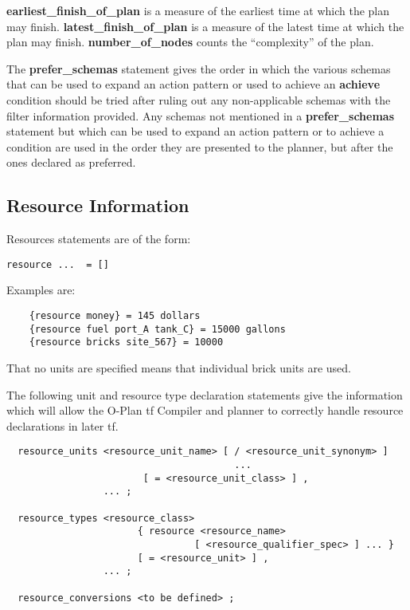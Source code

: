 {\bf earliest\_finish\_of\_plan} is a measure of the earliest time at which
the plan may finish.  {\bf latest\_finish\_of\_plan} is a measure of the
latest time at which the plan may finish.  {\bf number\_of\_nodes} counts the
``complexity'' of the plan.

The {\bf prefer\_schemas} statement gives the order in which the various
schemas that can be used to expand an action pattern or used to achieve
an {\bf achieve} condition should be tried after ruling out any
non-applicable schemas with the filter information provided.  Any
schemas not mentioned in a {\bf prefer\_schemas} statement but which can
be used to expand an action pattern or to achieve a condition are used
in the order they are presented to the planner, but after the ones
declared as preferred. 

\subsection{Resource Information}

Resources statements are of the form:

\begin{tabbing}
   {\tt {resource   ... }
       =  []}
\end{tabbing}

Examples are:
\begin{verbatim}
    {resource money} = 145 dollars
    {resource fuel port_A tank_C} = 15000 gallons
    {resource bricks site_567} = 10000
\end{verbatim}

That no units are specified means that individual brick units are used.

The following unit and resource type declaration statements give the
information which will allow the O-Plan {\sc tf} Compiler and planner to
correctly handle resource declarations in later {\sc tf}.

\begin{verbatim}
  resource_units <resource_unit_name> [ / <resource_unit_synonym> ]
                                        ...
                        [ = <resource_unit_class> ] ,
                 ... ;

  resource_types <resource_class>
                       { resource <resource_name>
                                 [ <resource_qualifier_spec> ] ... }
                       [ = <resource_unit> ] ,
                 ... ;

  resource_conversions <to be defined> ;
\end{verbatim}

